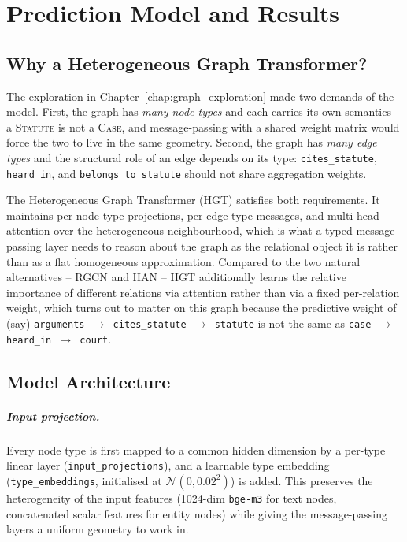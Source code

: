 \chapter{Prediction Model and Results}
\label{chap:results}

\section{Why a Heterogeneous Graph Transformer?}

The exploration in Chapter~\ref{chap:graph_exploration} made two
demands of the model. First, the graph has \emph{many node types} and
each carries its own semantics -- a \textsc{Statute} is not a
\textsc{Case}, and message-passing with a shared weight matrix would
force the two to live in the same geometry. Second, the graph has
\emph{many edge types} and the structural role of an edge depends on
its type: \texttt{cites\_statute}, \texttt{heard\_in}, and
\texttt{belongs\_to\_statute} should not share aggregation weights.

The Heterogeneous Graph Transformer (HGT) satisfies both
requirements. It maintains per-node-type projections, per-edge-type
messages, and multi-head attention over the heterogeneous
neighbourhood, which is what a typed message-passing layer needs to
reason about the graph as the relational object it is rather than as
a flat homogeneous approximation. Compared to the two natural
alternatives -- RGCN and HAN -- HGT additionally learns the relative
importance of different relations via attention rather than via a
fixed per-relation weight, which turns out to matter on this graph
because the predictive weight of (say)
\texttt{arguments\,$\to$\,cites\_statute\,$\to$\,statute} is not the
same as
\texttt{case\,$\to$\,heard\_in\,$\to$\,court}.

\section{Model Architecture}

\paragraph{Input projection.} Every node type is first mapped to a
common hidden dimension by a per-type linear layer
(\texttt{input\_projections}), and a learnable type embedding
(\texttt{type\_embeddings}, initialised at $\mathcal{N}(0,0.02^2)$) is
added. This preserves the heterogeneity of the input features (1024-dim
\texttt{bge-m3} for text nodes, concatenated scalar features for
entity nodes) while giving the message-passing layers a uniform
geometry to work in.

